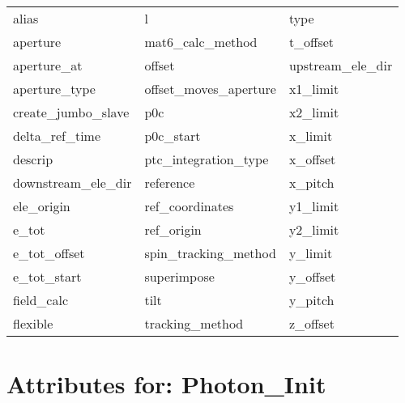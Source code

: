  \begin{tabular}{lll} \toprule
alias                       & l                           & type                        \\
aperture                    & mat6_calc_method            & t_offset                    \\
aperture_at                 & offset                      & upstream_ele_dir            \\
aperture_type               & offset_moves_aperture       & x1_limit                    \\
create_jumbo_slave          & p0c                         & x2_limit                    \\
delta_ref_time              & p0c_start                   & x_limit                     \\
descrip                     & ptc_integration_type        & x_offset                    \\
downstream_ele_dir          & reference                   & x_pitch                     \\
ele_origin                  & ref_coordinates             & y1_limit                    \\
e_tot                       & ref_origin                  & y2_limit                    \\
e_tot_offset                & spin_tracking_method        & y_limit                     \\
e_tot_start                 & superimpose                 & y_offset                    \\
field_calc                  & tilt                        & y_pitch                     \\
flexible                    & tracking_method             & z_offset                    \\
 \bottomrule
 \end{tabular}
 \vfill
 
 \section{Attributes for: Photon_Init}
 \label{s:list.photon.init}
 

